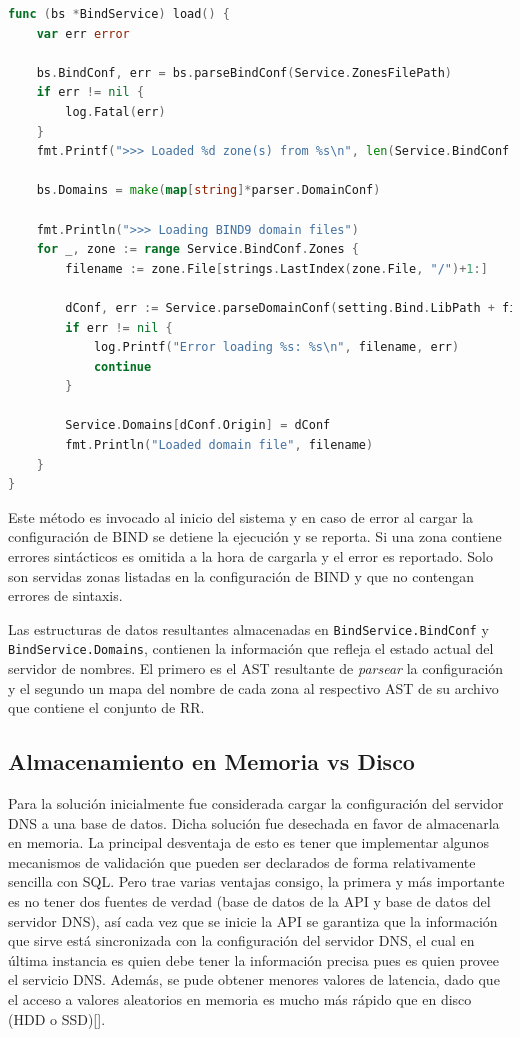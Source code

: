 \begin{lstlisting}[frame=single, language=Go, caption=Implementación de la función \textbf{load} para BIND.]
func (bs *BindService) load() {
	var err error

	bs.BindConf, err = bs.parseBindConf(Service.ZonesFilePath)
	if err != nil {
		log.Fatal(err)
	}
	fmt.Printf(">>> Loaded %d zone(s) from %s\n", len(Service.BindConf.Zones), Service.ZonesFilePath)

	bs.Domains = make(map[string]*parser.DomainConf)

	fmt.Println(">>> Loading BIND9 domain files")
	for _, zone := range Service.BindConf.Zones {
		filename := zone.File[strings.LastIndex(zone.File, "/")+1:]

		dConf, err := Service.parseDomainConf(setting.Bind.LibPath + filename)
		if err != nil {
			log.Printf("Error loading %s: %s\n", filename, err)
			continue
		}

		Service.Domains[dConf.Origin] = dConf
		fmt.Println("Loaded domain file", filename)
	}
}
\end{lstlisting}

Este método es invocado al inicio del sistema y en caso de error al cargar la configuración de BIND se detiene la ejecución y se reporta. Si una zona contiene errores sintácticos es omitida a la hora de cargarla y el error es reportado. Solo son servidas zonas listadas en la configuración de BIND y que no contengan errores de sintaxis.

Las estructuras de datos resultantes almacenadas en \verb|BindService.BindConf| y \verb|BindService.Domains|, contienen la información que refleja el estado actual del servidor de nombres. El primero es el AST resultante de \textit{parsear} la configuración y el segundo un mapa del nombre de cada zona al respectivo AST de su archivo que contiene el conjunto de RR.

\subsection{Almacenamiento en Memoria vs Disco}

Para la solución inicialmente fue considerada cargar la configuración del servidor DNS a una base de datos. Dicha solución fue desechada en favor de almacenarla en memoria. La principal desventaja de esto es tener que implementar algunos mecanismos de validación que pueden ser declarados de forma relativamente sencilla con SQL. Pero trae varias ventajas consigo, la primera y más importante es no tener dos fuentes de verdad (base de datos de la API y base de datos del servidor DNS), así cada vez que se inicie la API se garantiza que la información que sirve está sincronizada con la configuración del servidor DNS, el cual en última instancia es quien debe tener la información precisa pues es quien provee el servicio DNS. Además, se pude obtener menores valores de latencia, dado que el acceso a valores aleatorios en memoria es mucho más rápido que en disco (HDD o SSD)[\cite{jacobs2009pathologies}].

